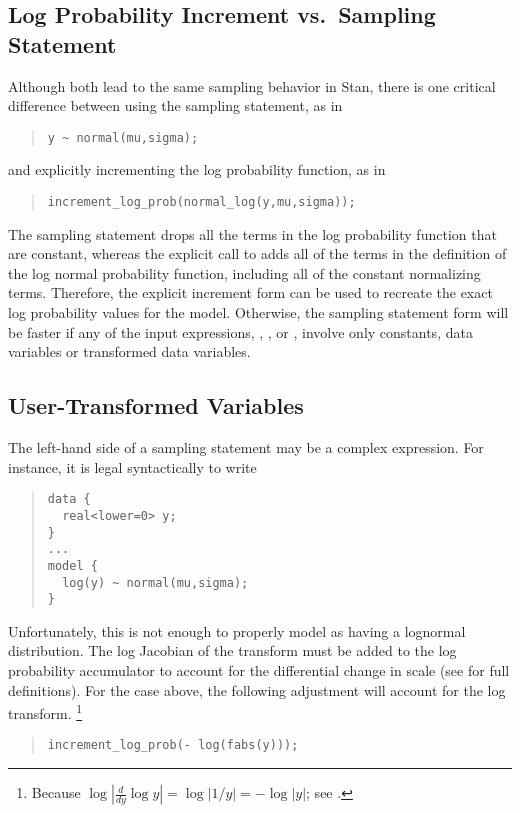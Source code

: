 \subsection{Log Probability Increment vs.\ Sampling Statement}

Although both lead to the same sampling behavior in Stan, there is one
critical difference between using the sampling statement, as in
%
\begin{quote}
\begin{Verbatim}
y ~ normal(mu,sigma);
\end{Verbatim}
\end{quote}
%
and explicitly incrementing the log probability function, as in
%
\begin{quote}
\begin{Verbatim}
increment_log_prob(normal_log(y,mu,sigma));
\end{Verbatim}
\end{quote}
%
The sampling statement drops all the terms in the log probability
function that are constant, whereas the explicit call to
 adds all of the terms in the definition of the log
normal probability function, including all of the constant normalizing
terms.  Therefore, the explicit increment form can be used to recreate
the exact log probability values for the model.  Otherwise, the
sampling statement form will be faster if any of the input expressions,
, , or , involve only constants, data
variables or transformed data variables. 


\subsection{User-Transformed Variables}

The left-hand side of a sampling statement may be a complex
expression.  For instance, it is legal syntactically to write
%
\begin{quote}
\begin{Verbatim}
data {
  real<lower=0> y;
}
...
model {
  log(y) ~ normal(mu,sigma);
}
\end{Verbatim}
\end{quote}
%
Unfortunately, this is not enough to properly model  as having
a lognormal distribution.  The log Jacobian of the transform must be
added to the log probability accumulator to account for the
differential change in scale (see  for
full definitions).  For the case above, the following adjustment will
account for the log transform.%
%
\footnote{Because $\log | \frac{d}{dy} \log y | = \log | 1/y | = - \log
  |y|$;  see .}
%
\begin{quote}
\begin{Verbatim}
increment_log_prob(- log(fabs(y)));
\end{Verbatim}
\end{quote}
%

